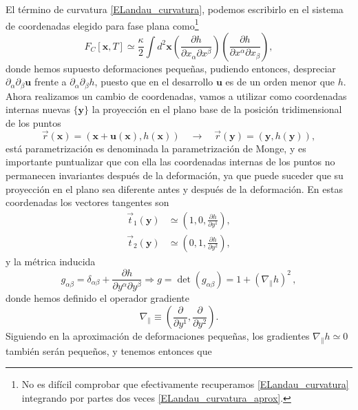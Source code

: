 El término de curvatura \eqref{ELandau_curvatura}, podemos escribirlo en el sistema de coordenadas
elegido para fase plana como\footnote{No es difícil comprobar que
  efectivamente recuperamos \eqref{ELandau_curvatura} integrando por partes
  dos veces \eqref{ELandau_curvatura_aprox}.}
\begin{equation}\label{ELandau_curvatura_aprox}
F_C[\mathbf{x},T]\simeq\frac{\kappa}{2}\int d^2\mathbf{x} 
\left(\frac{\partial h}{\partial x_{\alpha} \partial x^{\beta}}\right)
\left(\frac{\partial h}{\partial x^{\alpha} \partial x_{\beta}}\right),
\end{equation}
donde hemos supuesto deformaciones pequeñas, pudiendo entonces, despreciar
$\partial_{\alpha}\partial_{\beta} \mathbf{u}$ frente a
$\partial_{\alpha}\partial_{\beta} h$, puesto que en el desarrollo
$\mathbf{u}$ es de un orden menor que $h$. Ahora realizamos un cambio de
coordenadas, vamos a utilizar como coordenadas internas nuevas $\{\mathbf{y}\}$ la proyección
en el plano base de la posición tridimensional de los puntos
\begin{equation*}
\vec{r}(\mathbf{x})=(\mathbf{x}+\mathbf{u(\mathbf{x})},h(\mathbf{x}))\quad
\rightarrow \quad \vec{r}(\mathbf{y})=(\mathbf{y},h(\mathbf{y})),
\end{equation*}
está parametrización es denominada la parametrización de Monge, y es
importante puntualizar que con ella las coordenadas internas de los puntos no
permanecen invariantes después de la deformación, ya que puede suceder que su
proyección en el plano sea diferente antes y después de la deformación. En
estas coordenadas los vectores tangentes son
\begin{align*}
 \vec{t}_1(\mathbf{y})&\simeq\left(1,0,\frac{\partial h}{\partial y^1}\right),\\
 \vec{t}_2(\mathbf{y})&\simeq\left(0,1,\frac{\partial h}{\partial y^2}\right),
\end{align*}
y la métrica inducida
\begin{equation*}
g_{\alpha\beta}=\delta_{\alpha\beta}+\frac{\partial h}{\partial
  y^{\alpha} \partial y^{\beta}}\Rightarrow g=\det
(g_{\alpha\beta})=1+\left(\nabla_{\|} h\right)^2\, ,
\end{equation*}
donde hemos definido el operador gradiente 
\begin{equation*}
\nabla_{\|}\equiv \left(\frac{\partial }{\partial y^1},\frac{\partial }{\partial y^2}\right).
\end{equation*}
Siguiendo en la aproximación de deformaciones pequeñas, los gradientes
$\nabla_{\|} h\simeq 0$ también serán pequeños, y tenemos entonces que
